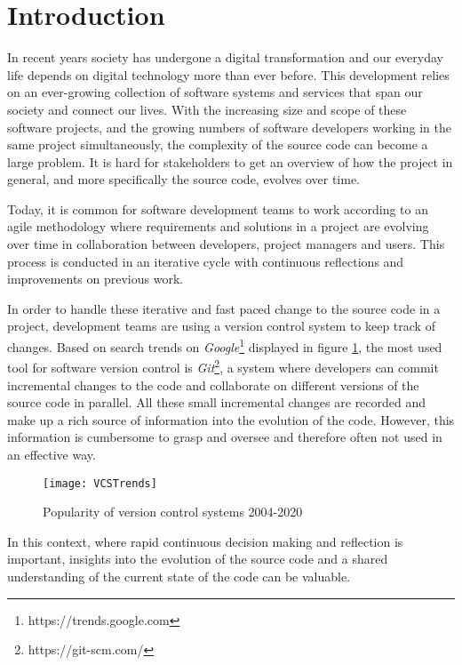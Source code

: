 

\section{Introduction}
In recent years society has undergone a digital transformation and our everyday life depends on digital technology more than ever before. 
This development relies on an ever-growing collection of software systems and services that span our society and connect our lives. 
With the increasing size and scope of these software projects, and the growing numbers of software developers working in the same project simultaneously, the complexity of the source code can become a large problem. 
It is hard for stakeholders to get an overview of how the project in general, and more specifically the source code, evolves over time.

Today, it is common for software development teams to work according to an agile methodology \cite{hazzan_agile_2014} where requirements and solutions in a project are evolving over time in collaboration between developers, project managers and users. 
This process is conducted in an iterative cycle with continuous reflections and improvements on previous work.

In order to handle these iterative and fast paced change to the source code in a project, development teams are using a version control system to keep track of changes. 
Based on search trends on \textit{Google}\footnote{https://trends.google.com} displayed in figure \ref{fig:vcstrends}, the most used tool for software version control is \textit{Git}\footnote{https://git-scm.com/}, a system where developers can commit incremental changes to the code and collaborate on different versions of the source code in parallel. 
All these small incremental changes are recorded and make up a rich source of information into the evolution of the code. 
However, this information is cumbersome to grasp and oversee and therefore often not used in an effective way.

\begin{figure}[b]
  \texttt{[image: VCSTrends]}
  \caption[VCS Trends]{Popularity of version control systems 2004-2020}
  \label{fig:vcstrends}
  \centering
\end{figure}

In this context, where rapid continuous decision making and reflection is important, insights into the evolution of the source code and a shared understanding of the current state of the code can be valuable. \cite{ball_if_1997}

